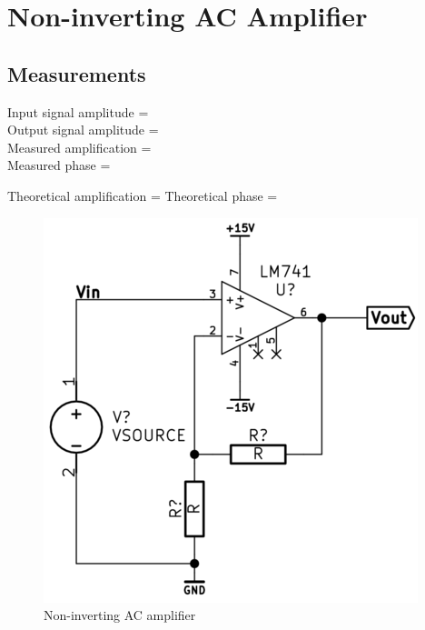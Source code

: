 \documentclass[]{article}
\begin{document}

\section{Non-inverting AC Amplifier}\label{non-inverting-ac-amplifier}

\subsection{Measurements}\label{measurements-3}

Input signal amplitude =\\Output signal amplitude =\\Measured
amplification =\\Measured phase =

Theoretical amplification = Theoretical phase =

\begin{figure}[htbp]
\centering
\includegraphics{img/noninvACamp.png}
\caption{Non-inverting AC amplifier}
\end{figure}


\end{document}
